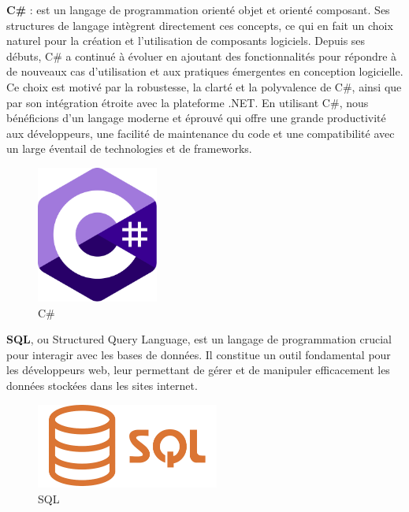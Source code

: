 \textbf{C\#} : est un langage de programmation orienté objet et orienté composant. Ses structures de langage intègrent directement ces concepts, ce qui en fait un choix naturel pour la création et l'utilisation de composants logiciels. Depuis ses débuts, C\# a continué à évoluer en ajoutant des fonctionnalités pour répondre à de nouveaux cas d'utilisation et aux pratiques émergentes en conception logicielle. Ce choix est motivé par la robustesse, la clarté et la polyvalence de C\#, ainsi que par son intégration étroite avec la plateforme .NET. En utilisant C\#, nous bénéficions d'un langage moderne et éprouvé qui offre une grande productivité aux développeurs, une facilité de maintenance du code et une compatibilité avec un large éventail de technologies et de frameworks.
\\
\begin{figure}[H]
    \centering
    \includegraphics[width=4cm]{Figures/csharp.png}
    \caption{C\#}
\end{figure}


\textbf{SQL}, ou Structured Query Language, est un langage de programmation crucial pour interagir avec les bases de données. Il constitue un outil fondamental pour les développeurs web, leur permettant de gérer et de manipuler efficacement les données stockées dans les sites internet.
\\
\begin{figure}[H]
    \centering
    \includegraphics[width=6cm]{Figures/sql.png}
    \caption{SQL}
\end{figure}



